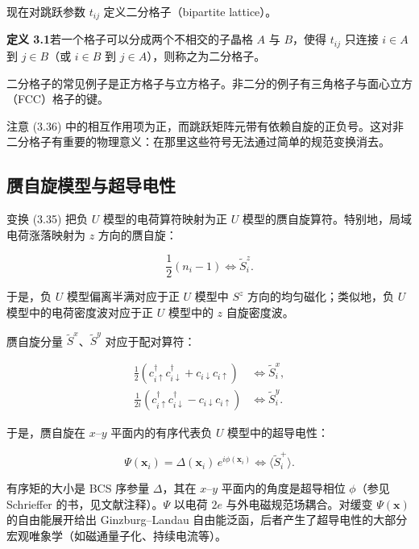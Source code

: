 现在对跳跃参数 $t_{ij}$ 定义二分格子（bipartite lattice）。

\medskip
\noindent\textbf{定义 3.1}\quad 若一个格子可以分成两个不相交的子晶格 $A$ 与 $B$，使得 $t_{ij}$ 只连接 $i \in A$ 到 $j \in B$（或 $i \in B$ 到 $j \in A$），则称之为二分格子。
\medskip

二分格子的常见例子是正方格子与立方格子。非二分的例子有三角格子与面心立方（FCC）格子的键。

注意 (3.36) 中的相互作用项为正，而跳跃矩阵元带有依赖自旋的正负号。这对非二分格子有重要的物理意义：在那里这些符号无法通过简单的规范变换消去。

\subsection{赝自旋模型与超导电性}

变换 (3.35) 把负 $U$ 模型的电荷算符映射为正 $U$ 模型的赝自旋算符。特别地，局域电荷涨落映射为 $z$ 方向的赝自旋：

\begin{equation*}
\frac {1}{2} ( n _ {i} - 1 ) \Leftrightarrow \tilde {S} _ {i} ^ {z}.
\tag{3.40}
\end{equation*}

于是，负 $U$ 模型偏离半满对应于正 $U$ 模型中 $S^{z}$ 方向的均匀磁化；类似地，负 $U$ 模型中的电荷密度波对应于正 $U$ 模型中的 $z$ 自旋密度波。

赝自旋分量 $\tilde{S}^x$、$\tilde{S}^y$ 对应于配对算符：

\begin{align*}
\frac {1}{2} \left( c _ {i \uparrow} ^ {\dagger} c _ {i \downarrow} ^ {\dagger} + c _ {i \downarrow} c _ {i \uparrow} \right) & \Leftrightarrow \tilde {S} _ {i} ^ {x},\\
\frac {1}{2i} \left( c _ {i \uparrow} ^ {\dagger} c _ {i \downarrow} ^ {\dagger} - c _ {i \downarrow} c _ {i \uparrow} \right) & \Leftrightarrow \tilde {S} _ {i} ^ {y}.
\tag{3.41}
\end{align*}

于是，赝自旋在 $x$--$y$ 平面内的有序代表负 $U$ 模型中的超导电性：

\begin{equation*}
\Psi ( \mathbf {x} _ {i} ) = \Delta ( \mathbf {x} _ {i} ) \, e ^ {i \phi ( \mathbf {x} _ {i} )} \Leftrightarrow \langle \tilde {S} _ {i} ^ {+} \rangle .
\tag{3.42}
\end{equation*}

有序矩的大小是 BCS 序参量 $\Delta$，其在 $x$--$y$ 平面内的角度是超导相位 $\phi$（参见 Schrieffer 的书，见文献注释）。$\Psi$ 以电荷 $2e$ 与外电磁规范场耦合。对缓变 $\Psi(\mathbf{x})$ 的自由能展开给出 Ginzburg--Landau 自由能泛函，后者产生了超导电性的大部分宏观唯象学（如磁通量子化、持续电流等）。


